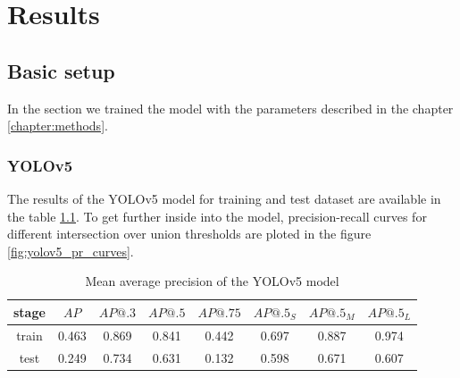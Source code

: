 \chapter{Results}
\label{chapter:results}

\section{Basic setup}
In the section we trained the model with the parameters described in the chapter \ref{chapter:methods}.
\subsection{YOLOv5}
The results of the YOLOv5 model for training and test dataset are available in the table \ref{tab:yolov5_basic}. To get further inside into the model, precision-recall curves for different intersection over union thresholds are ploted in the figure \ref{fig:yolov5_pr_curves}.
\begin{table}
    \begin{tabular}{c|c|c|c|c|c|c|c}
        stage & $AP$  & $AP@.3$ & $AP@.5$ & $AP@.75$ & $AP@.5_S$ & $AP@.5_M$ & $AP@.5_L$ \\ \hline
        train & 0.463 & 0.869   & 0.841   & 0.442    & 0.697     & 0.887     & 0.974     \\ \hline
        test  & 0.249 & 0.734   & 0.631   & 0.132    & 0.598     & 0.671     & 0.607     \\
    \end{tabular}
    \caption{Mean average precision of the YOLOv5 model}
    \label{tab:yolov5_basic}
\end{table}


